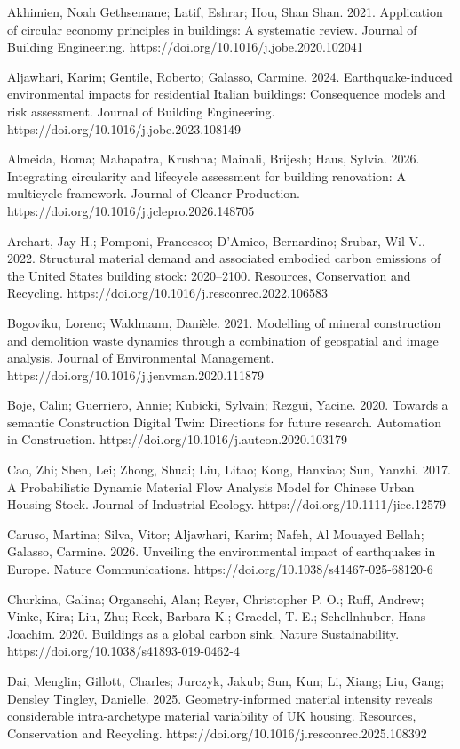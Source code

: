 Akhimien, Noah Gethsemane; Latif, Eshrar; Hou, Shan Shan. 2021. Application of circular economy principles in buildings: A systematic review. Journal of Building Engineering. https://doi.org/10.1016/j.jobe.2020.102041

Aljawhari, Karim; Gentile, Roberto; Galasso, Carmine. 2024. Earthquake-induced environmental impacts for residential Italian buildings: Consequence models and risk assessment. Journal of Building Engineering. https://doi.org/10.1016/j.jobe.2023.108149

Almeida, Roma; Mahapatra, Krushna; Mainali, Brijesh; Haus, Sylvia. 2026. Integrating circularity and lifecycle assessment for building renovation: A multicycle framework. Journal of Cleaner Production. https://doi.org/10.1016/j.jclepro.2026.148705

Arehart, Jay H.; Pomponi, Francesco; D'Amico, Bernardino; Srubar, Wil V.. 2022. Structural material demand and associated embodied carbon emissions of the United States building stock: 2020--2100. Resources, Conservation and Recycling. https://doi.org/10.1016/j.resconrec.2022.106583

Bogoviku, Lorenc; Waldmann, Danièle. 2021. Modelling of mineral construction and demolition waste dynamics through a combination of geospatial and image analysis. Journal of Environmental Management. https://doi.org/10.1016/j.jenvman.2020.111879

Boje, Calin; Guerriero, Annie; Kubicki, Sylvain; Rezgui, Yacine. 2020. Towards a semantic Construction Digital Twin: Directions for future research. Automation in Construction. https://doi.org/10.1016/j.autcon.2020.103179

Cao, Zhi; Shen, Lei; Zhong, Shuai; Liu, Litao; Kong, Hanxiao; Sun, Yanzhi. 2017. A Probabilistic Dynamic Material Flow Analysis Model for Chinese Urban Housing Stock. Journal of Industrial Ecology. https://doi.org/10.1111/jiec.12579

Caruso, Martina; Silva, Vitor; Aljawhari, Karim; Nafeh, Al Mouayed Bellah; Galasso, Carmine. 2026. Unveiling the environmental impact of earthquakes in Europe. Nature Communications. https://doi.org/10.1038/s41467-025-68120-6

Churkina, Galina; Organschi, Alan; Reyer, Christopher P. O.; Ruff, Andrew; Vinke, Kira; Liu, Zhu; Reck, Barbara K.; Graedel, T. E.; Schellnhuber, Hans Joachim. 2020. Buildings as a global carbon sink. Nature Sustainability. https://doi.org/10.1038/s41893-019-0462-4

Dai, Menglin; Gillott, Charles; Jurczyk, Jakub; Sun, Kun; Li, Xiang; Liu, Gang; Densley Tingley, Danielle. 2025. Geometry-informed material intensity reveals considerable intra-archetype material variability of UK housing. Resources, Conservation and Recycling. https://doi.org/10.1016/j.resconrec.2025.108392

